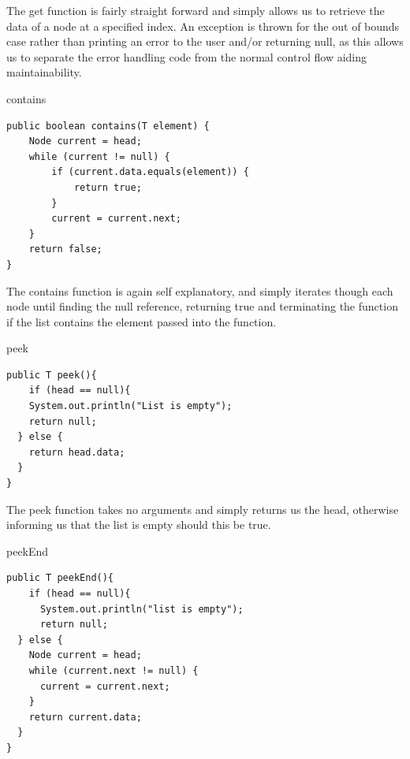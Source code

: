 \documentclass[a4paper]{article}
\begin{document}
The get function is fairly straight forward and simply allows 
us to retrieve the data of a node at a specified index.
An exception is thrown for the out of bounds case rather than 
printing an error to the user and/or returning null, 
as this allows us to separate the error handling code 
from the normal control flow aiding maintainability.

\newpage
\begin{algorithm}
\caption{contains}\label{euclid}

\begin{verbatim}
public boolean contains(T element) {
    Node current = head;
    while (current != null) {
        if (current.data.equals(element)) {
            return true;
        }
        current = current.next;
    }
    return false;
}
\end{verbatim}

\end{algorithm}

The contains function is again self explanatory, and simply
iterates though each node until finding the null reference, 
returning true and terminating the function if the list contains
the element passed into the function. \\



\begin{algorithm}
\caption{peek}\label{euclid}

\begin{verbatim}
public T peek(){
    if (head == null){
    System.out.println("List is empty");
    return null;
  } else {
    return head.data;
  }
}
\end{verbatim}

\end{algorithm}

The peek function takes no arguments and simply returns us the head, 
otherwise informing us that the list is empty should this be true.

\pagebreak


\begin{algorithm}
\caption{peekEnd}\label{euclid}

\begin{verbatim}
public T peekEnd(){
    if (head == null){
      System.out.println("list is empty");
      return null;
  } else {
    Node current = head;
    while (current.next != null) {
      current = current.next;
    }
    return current.data;
  }
}
\end{verbatim}

\end{algorithm}
\end{document}
